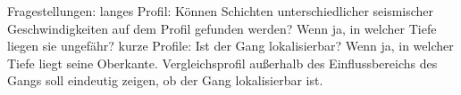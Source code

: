 Fragestellungen:
langes Profil: Können Schichten unterschiedlicher seismischer Geschwindigkeiten auf dem Profil gefunden werden? Wenn ja, in welcher Tiefe liegen sie ungefähr?
kurze Profile: Ist der Gang lokalisierbar? Wenn ja, in welcher Tiefe liegt seine Oberkante. Vergleichsprofil außerhalb des Einflussbereichs des Gangs soll eindeutig zeigen, ob der Gang lokalisierbar ist.